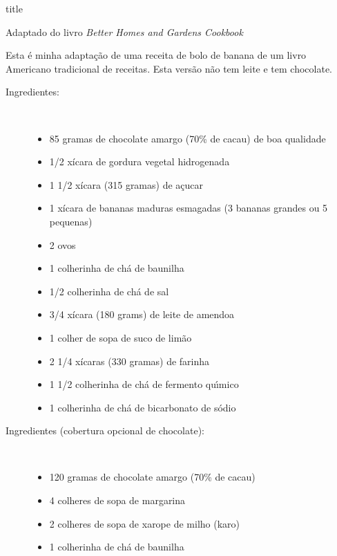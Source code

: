 \documentclass [11pt, letterpaper] {article}
\begin{document}
 {title}

\begin {flushright}
Adaptado do livro {\it Better Homes and Gardens Cookbook}
\end {flushright}

Esta \'e minha adapta\c{c}\~ao de uma receita de bolo de banana de um livro Americano tradicional de receitas. Esta vers\~ao n\~ao tem leite e tem chocolate. 
\ \newline
\begin{description}

\item[Ingredientes:]\ \\
	\begin{itemize}
	\item 85 gramas de chocolate amargo (70\% de cacau) de boa qualidade
	\item 1/2 x\'icara de gordura vegetal hidrogenada
	\item 1 1/2 x\'icara (315 gramas) de a\c{c}ucar
	\item 1 x\'icara de bananas maduras esmagadas (3 bananas grandes ou 5 pequenas)
	\item 2 ovos
	\item 1 colherinha de ch\'a de baunilha
	\item 1/2 colherinha de ch\'a de sal 
	\item 3/4 x\'icara (180 grams) de leite de amendoa 
	\item 1 colher de sopa de suco de lim\~ao 
        \item 2 1/4 x\'icaras (330 gramas) de farinha
	\item 1 1/2 colherinha de ch\'a de fermento qu\'{\i}mico
	\item 1 colherinha de ch\'a de bicarbonato de s\'odio
	\end{itemize}
	
\item[Ingredientes (cobertura opcional de chocolate):]\ \\
	\begin{itemize}
	\item 120 gramas de chocolate amargo (70\% de cacau)
	\item 4 colheres de sopa de margarina 
	\item 2 colheres de sopa de xarope de milho (karo) 
	\item 1 colherinha de ch\'a de baunilha
	\end{itemize}
	

\end{description}
\end{document}
